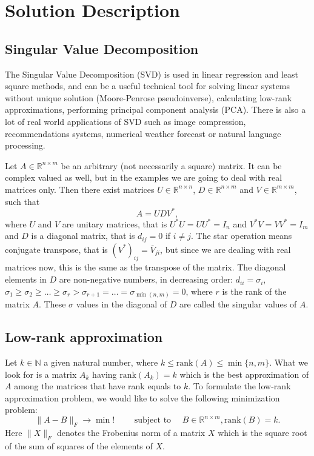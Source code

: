 \section{Solution Description}

\subsection{Singular Value Decomposition}

The Singular Value Decomposition (SVD) is used in linear regression and least square methods, and can be a useful technical tool for solving linear systems without unique solution (Moore-Penrose pseudoinverse), calculating low-rank approximations, performing principal component analysis (PCA). There is also a lot of real world applications of SVD such as image compression, recommendations systems, numerical weather forecast or natural language processing.

Let $A \in \mathbb{R}^{n \times m}$ be an arbitrary (not necessarily a square) matrix. It can be complex valued as well, but in the examples we are going to deal with real matrices only. Then there exist matrices $U \in \mathbb{R}^{n \times n}$, $D \in \mathbb{R}^{n \times m}$ and $V \in \mathbb{R}^{m \times m}$, such that $$ A = U D V^*, $$ where $U$ and $V$ are unitary matrices, that is $U^*U = U U^* = I_n$ and $V^*V=V V^*=I_m$ and $D$ is a diagonal matrix, that is $d_{i j}=0$ if $i \ne j$. The star operation means conjugate transpose, that is $(V^*)_{i j} = \overline V_{j i}$, but since we are dealing with real matrices now, this is the same as the transpose of the matrix. The diagonal elements in $D$ are non-negative numbers, in decreasing order: $d_{ii} = \sigma_i$, $\sigma_1 \geq \sigma_2 \geq \ldots \geq \sigma_r > \sigma_{r+1} = \ldots = \sigma_{\min(n,m)} = 0$, where $r$ is the rank of the matrix $A$. These $\sigma$ values in the diagonal of $D$ are called the singular values of $A$.

\subsection*{Low-rank approximation}

Let $k \in \mathbb{N}$ a given natural number, where $k \leq \text{rank}(A) \leq \min \{n, m\}$. What we look for is a matrix $A_k$ having $ \text{rank}(A_k) = k$ which is the best approximation of $A$ among the matrices that have rank equals to $k$. To formulate the low-rank approximation problem, we would like to solve the following minimization problem: $$ \| A - B \|_F \to \min !\qquad \mbox{ subject to } \quad B \in \mathbb{R}^{n \times m},  \text{rank}(B) = k. $$ Here $\| X \|_F$ denotes the Frobenius norm of a matrix $X$ which is the square root of the sum of squares of the elements of $X$.
    
